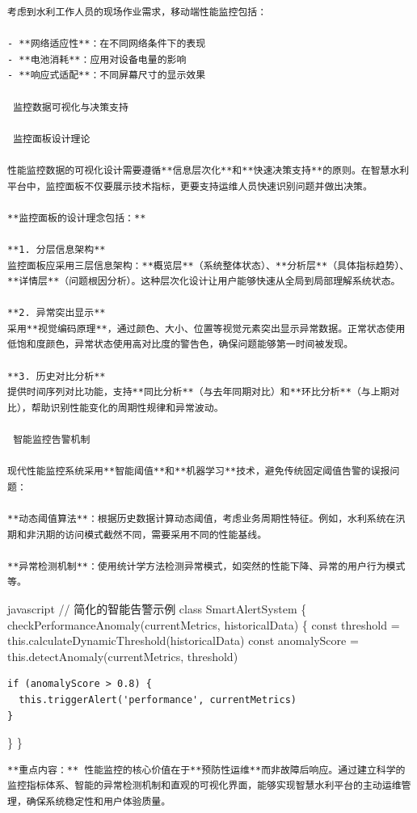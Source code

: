 {{\begin{lstlisting}
考虑到水利工作人员的现场作业需求，移动端性能监控包括：

- **网络适应性**：在不同网络条件下的表现
- **电池消耗**：应用对设备电量的影响
- **响应式适配**：不同屏幕尺寸的显示效果

 监控数据可视化与决策支持

 监控面板设计理论

性能监控数据的可视化设计需要遵循**信息层次化**和**快速决策支持**的原则。在智慧水利平台中，监控面板不仅要展示技术指标，更要支持运维人员快速识别问题并做出决策。

**监控面板的设计理念包括：**

**1. 分层信息架构**
监控面板应采用三层信息架构：**概览层**（系统整体状态）、**分析层**（具体指标趋势）、**详情层**（问题根因分析）。这种层次化设计让用户能够快速从全局到局部理解系统状态。

**2. 异常突出显示**
采用**视觉编码原理**，通过颜色、大小、位置等视觉元素突出显示异常数据。正常状态使用低饱和度颜色，异常状态使用高对比度的警告色，确保问题能够第一时间被发现。

**3. 历史对比分析**
提供时间序列对比功能，支持**同比分析**（与去年同期对比）和**环比分析**（与上期对比），帮助识别性能变化的周期性规律和异常波动。

 智能监控告警机制

现代性能监控系统采用**智能阈值**和**机器学习**技术，避免传统固定阈值告警的误报问题：

**动态阈值算法**：根据历史数据计算动态阈值，考虑业务周期性特征。例如，水利系统在汛期和非汛期的访问模式截然不同，需要采用不同的性能基线。

**异常检测机制**：使用统计学方法检测异常模式，如突然的性能下降、异常的用户行为模式等。
\end{lstlisting}

javascript // 简化的智能告警示例 class SmartAlertSystem \{ checkPerformanceAnomaly(currentMetrics, historicalData) \{ const threshold = this.calculateDynamicThreshold(historicalData) const anomalyScore = this.detectAnomaly(currentMetrics, threshold)

\begin{verbatim}
if (anomalyScore > 0.8) {
  this.triggerAlert('performance', currentMetrics)
}
\end{verbatim}

\} \}

\begin{lstlisting}
**重点内容：** 性能监控的核心价值在于**预防性运维**而非故障后响应。通过建立科学的监控指标体系、智能的异常检测机制和直观的可视化界面，能够实现智慧水利平台的主动运维管理，确保系统稳定性和用户体验质量。


\end{lstlisting}}}
